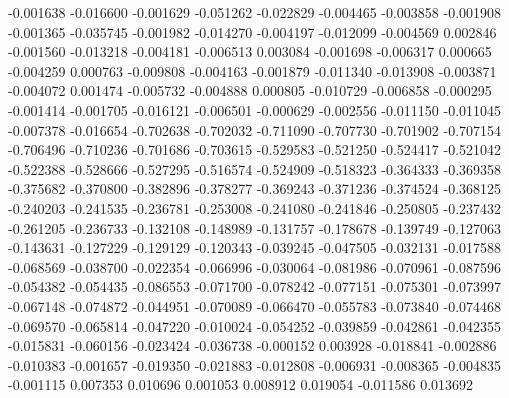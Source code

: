 -0.001638
-0.016600
-0.001629
-0.051262
-0.022829
-0.004465
-0.003858
-0.001908
-0.001365
-0.035745
-0.001982
-0.014270
-0.004197
-0.012099
-0.004569
0.002846
-0.001560
-0.013218
-0.004181
-0.006513
0.003084
-0.001698
-0.006317
0.000665
-0.004259
0.000763
-0.009808
-0.004163
-0.001879
-0.011340
-0.013908
-0.003871
-0.004072
0.001474
-0.005732
-0.004888
0.000805
-0.010729
-0.006858
-0.000295
-0.001414
-0.001705
-0.016121
-0.006501
-0.000629
-0.002556
-0.011150
-0.011045
-0.007378
-0.016654
-0.702638
-0.702032
-0.711090
-0.707730
-0.701902
-0.707154
-0.706496
-0.710236
-0.701686
-0.703615
-0.529583
-0.521250
-0.524417
-0.521042
-0.522388
-0.528666
-0.527295
-0.516574
-0.524909
-0.518323
-0.364333
-0.369358
-0.375682
-0.370800
-0.382896
-0.378277
-0.369243
-0.371236
-0.374524
-0.368125
-0.240203
-0.241535
-0.236781
-0.253008
-0.241080
-0.241846
-0.250805
-0.237432
-0.261205
-0.236733
-0.132108
-0.148989
-0.131757
-0.178678
-0.139749
-0.127063
-0.143631
-0.127229
-0.129129
-0.120343
-0.039245
-0.047505
-0.032131
-0.017588
-0.068569
-0.038700
-0.022354
-0.066996
-0.030064
-0.081986
-0.070961
-0.087596
-0.054382
-0.054435
-0.086553
-0.071700
-0.078242
-0.077151
-0.075301
-0.073997
-0.067148
-0.074872
-0.044951
-0.070089
-0.066470
-0.055783
-0.073840
-0.074468
-0.069570
-0.065814
-0.047220
-0.010024
-0.054252
-0.039859
-0.042861
-0.042355
-0.015831
-0.060156
-0.023424
-0.036738
-0.000152
0.003928
-0.018841
-0.002886
-0.010383
-0.001657
-0.019350
-0.021883
-0.012808
-0.006931
-0.008365
-0.004835
-0.001115
0.007353
0.010696
0.001053
0.008912
0.019054
-0.011586
0.013692
